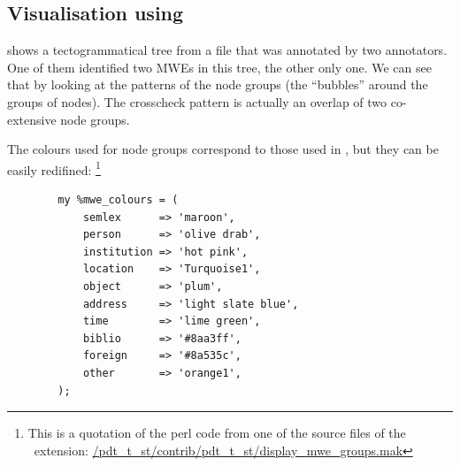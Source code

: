 \subsection{Visualisation using \tred}

 shows a tectogrammatical tree from a file that was annotated by two annotators. One of them identified two MWEs in this tree, the other only one. We can see that by looking at the patterns of the node groups (the ``bubbles'' around the groups of nodes). The crosscheck pattern is actually an overlap of two co-extensive node groups.

The colours used for node groups correspond to those used in \seman, but they can be easily redifined:%
\footnote{This is a quotation of the perl code from one of the source files of the \tred\ extension: \url{/pdt_t_st/contrib/pdt_t_st/display_mwe_groups.mak}} 
%
\begin{verbatim}
        my %mwe_colours = (
            semlex      => 'maroon',
            person      => 'olive drab',
            institution => 'hot pink',
            location    => 'Turquoise1',
            object      => 'plum',
            address     => 'light slate blue',
            time        => 'lime green',
            biblio      => '#8aa3ff',
            foreign     => '#8a535c',
            other       => 'orange1',
        );
\end{verbatim}


